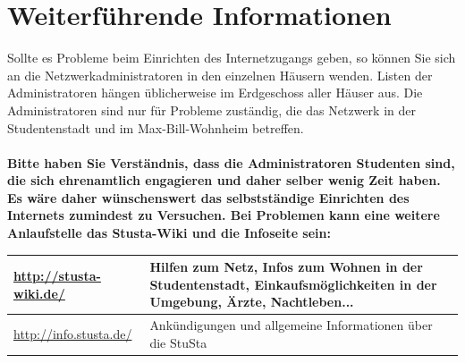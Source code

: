 \documentclass[a4paper,12pt]{scrartcl}
\begin{document}
\section*{Weiterführende Informationen}

Sollte es Probleme beim Einrichten des Internetzugangs geben, so können Sie sich an die Netzwerkadministratoren in den einzelnen Häusern wenden. Listen der Administratoren hängen üblicherweise im Erdgeschoss aller Häuser aus. Die Administratoren sind nur für Probleme zuständig, die das Netzwerk in der Studentenstadt und im Max-Bill-Wohnheim betreffen.
\\
\\
\textbf{Bitte haben Sie Verständnis, dass die Administratoren Studenten sind, die sich ehrenamtlich engagieren und daher selber wenig Zeit haben. Es wäre daher wünschenswert das selbstständige Einrichten des Internets zumindest zu Versuchen. Bei Problemen kann eine weitere Anlaufstelle das Stusta-Wiki und die Infoseite sein:}
\\
\begin{center}
  \begin{tabularx}{\linewidth}{|lX|}
    \hline
    \url{http://stusta-wiki.de/} & Hilfen zum Netz, Infos zum Wohnen in der Studentenstadt, Einkaufsmöglichkeiten in der Umgebung, Ärzte, Nachtleben...\\
    \hline
    \url{http://info.stusta.de/} & Ankündigungen und allgemeine Informationen über die StuSta\\
    \hline
  \end{tabularx}
\end{center}



\end{document}
